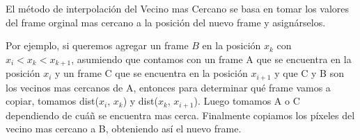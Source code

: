 \par El m\'etodo de interpolaci\'on del Vecino mas Cercano se basa en tomar los valores del frame orginal mas cercano a la posici\'on del nuevo frame y asign\'arselos.

\par Por ejemplo, si queremos agregar un frame $B$ en la posici\'on $x_k$ con $x_i < x_k < x_{k+1}$, asumiendo que contamos con un frame A que se encuentra en la posici\'on $x_i$ y un frame C que se encuentra en la posici\'on $x_{i+1}$ y que C y B son los vecinos mas cercanos de A, entonces para determinar qu\'e frame vamos a copiar, tomamos dist($x_i$, $x_k$) y dist($x_k$, $x_{i+1}$). Luego tomamos A o C dependiendo de cu\'añ se encuentra mas cerca. Finalmente copiamos los p\'ixeles del vecino mas cercano a B, obteniendo as\'i el nuevo frame.